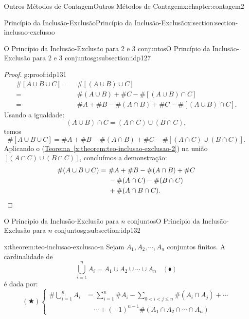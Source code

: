 \documentclass[oneside,10pt,]{book}
\newcommand{\xreffont}{\relax}
\newcommand{\qedhere}{\relax}
\numberwithin{equation}{section}
\newcommand{\lt}{<}
\newcommand{\amp}{&}
\begin{document}
\begin{chapterptx}{Outros Métodos de Contagem}{}{Outros Métodos de Contagem}{}{}{x:chapter:contagem2}
\begin{sectionptx}{Princípio da Inclusão-Exclusão}{}{Princípio da Inclusão-Exclusão}{}{}{x:section:section-inclusao-exclusao}
\begin{subsectionptx}{O Princípio da Inclusão-Exclusão para 2 e 3 conjuntos}{}{O Princípio da Inclusão-Exclusão para 2 e 3 conjuntos}{}{}{g:subsection:idp127}
\begin{proof}{}{g:proof:idp131}
\begin{align*}
\#[A\cup B\cup C] = \amp~\#[(A\cup B)\cup C] \\
= \amp ~\#(A\cup B)+\#C-\#[(A\cup B)\cap C] \\
= \amp ~ \#A+\#B-\#(A\cap B)+\#C-\#[(A\cup B)\cap C]. 
\end{align*}
Usando a igualdade:%
\begin{equation*}
(A\cup B)\cap C = (A\cap C)\cup (B\cap C), 
\end{equation*}
temos%
\begin{equation*}
\#[A\cup B\cup C] = \#A+\#B-\#(A\cap B)+\#C-\#[(A\cap C)\cup (B\cap C)]. 
\end{equation*}
Aplicando o (\hyperref[x:theorem:teo-inclusao-exclusao-2]{Teorema~{\xreffont\ref{x:theorem:teo-inclusao-exclusao-2}}}) na união \([(A\cap C)\cup (B\cap C)]\), concluímos a demonstração:%
\begin{align*}
\#(A\cup B\cup C) = \amp ~\#A+\#B-\#(A\cap B)+\#C \\
\amp ~ -\#(A\cap C)-\#(B\cap C) \\
\amp ~ +\#(A\cap B\cap C). \qedhere
\end{align*}
%
\end{proof}
\end{subsectionptx}
%
%
\typeout{************************************************}
\typeout{************************************************}
%
\begin{subsectionptx}{O Princípio da Inclusão-Exclusão para \(n\) conjuntos}{}{O Princípio da Inclusão-Exclusão para \(n\) conjuntos}{}{}{g:subsection:idp132}
\begin{theorem}{}{}{x:theorem:teo-inclusao-exclusao-n}%
Sejam \(A_1,A_2,\cdots,A_n\) conjuntos finitos. A cardinalidade de%
\begin{equation*}
\bigcup_{i=1}^{n}A_i =  A_1 \cup A_2 \cup \cdots \cup A_n ~~~~ (\blacklozenge)
\end{equation*}
é dada por:%
\begin{equation*}
(\bigstar)  \begin{cases} \displaystyle\#\bigcup_{i=1}^{n}A_i \amp \displaystyle=  \sum_{i=1}^{n}\#A_i-\sum_{0 \lt  i \lt j   \leq n}\#(A_i\cap A_j)+\cdots\\
\amp ~~~~~ \displaystyle\cdots  +(-1)^{n-1}\#(A_1\cap A_2\cap \cdots\cap A_n) \end{cases}
\end{equation*}
%
\end{theorem}

\end{subsectionptx}
\end{sectionptx}
\end{chapterptx}
\end{document}
